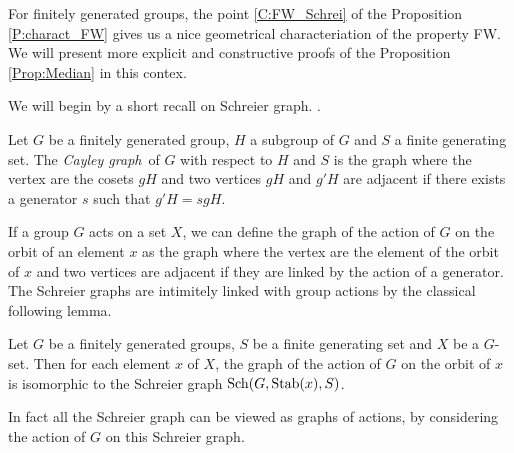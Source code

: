 For finitely generated groups, the point \ref{C:FW_Schrei} of the Proposition \ref{P:charact_FW} gives us a nice geometrical characteriation of the property FW. We will present more explicit and constructive proofs of the Proposition \ref{Prop:Median} in this contex. 

We will begin by a short recall on Schreier graph. .
%
\begin{defn}
Let $G$ be a finitely generated group, $H$ a subgroup of $G$ and $S$ a finite generating set. The \emph{Cayley graph} of $G$ with respect to $H$ and $S$ is the graph where the vertex are the cosets $gH$ and two vertices $gH$ and $g'H$ are adjacent if there exists a generator $s$ such that $g'H = sgH$.
\end{defn}
%
If a group $G$ acts on a set $X$, we can define the graph of the action of $G$ on the orbit of an element $x$ as the graph where the vertex are the element of the orbit of $x$ and two vertices are adjacent if they are linked by the action of a generator. The Schreier graphs are intimitely linked with group actions by the classical following lemma.
%
%
\begin{lem}\label{L:gen_wreath}
Let $G$ be a finitely generated groups, $S$ be a finite generating set and $X$ be a $G$-set. Then for each element $x$ of $X$, the graph of the action of $G$ on the orbit of $x$ is isomorphic to the Schreier graph $\operatorname{Sch}(G,\operatorname{Stab}(x),S)$.
\end{lem}
%
%
In fact all the Schreier graph can be viewed as graphs of actions, by considering the action of $G$ on this Schreier graph.

